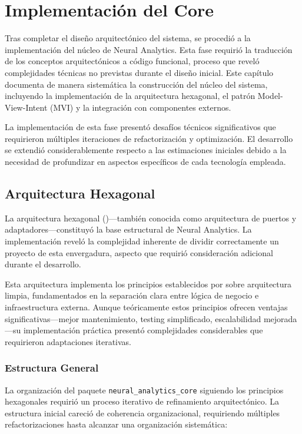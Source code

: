 \chapter{Implementación del Core}\label{ch:core_implementing}

Tras completar el diseño arquitectónico del sistema, se procedió a la implementación del núcleo de Neural Analytics. Esta fase requirió la traducción de los conceptos arquitectónicos a código funcional, proceso que reveló complejidades técnicas no previstas durante el diseño inicial. Este capítulo documenta de manera sistemática la construcción del núcleo del sistema, incluyendo la implementación de la arquitectura hexagonal, el patrón Model-View-Intent (MVI) y la integración con componentes externos.

La implementación de esta fase presentó desafíos técnicos significativos que requirieron múltiples iteraciones de refactorización y optimización. El desarrollo se extendió considerablemente respecto a las estimaciones iniciales debido a la necesidad de profundizar en aspectos específicos de cada tecnología empleada.

\section{Arquitectura Hexagonal}

La arquitectura hexagonal (\citeyear{martin2017clean})—también conocida como arquitectura de puertos y adaptadores—constituyó la base estructural de Neural Analytics. La implementación reveló la complejidad inherente de dividir correctamente un proyecto de esta envergadura, aspecto que requirió consideración adicional durante el desarrollo.

Esta arquitectura implementa los principios establecidos por  sobre arquitectura limpia, fundamentados en la separación clara entre lógica de negocio e infraestructura externa. Aunque teóricamente estos principios ofrecen ventajas significativas—mejor mantenimiento, testing simplificado, escalabilidad mejorada—su implementación práctica presentó complejidades considerables que requirieron adaptaciones iterativas.

\subsection{Estructura General}

La organización del paquete \texttt{neural\_analytics\_core} siguiendo los principios hexagonales requirió un proceso iterativo de refinamiento arquitectónico. La estructura inicial careció de coherencia organizacional, requiriendo múltiples refactorizaciones hasta alcanzar una organización sistemática:

